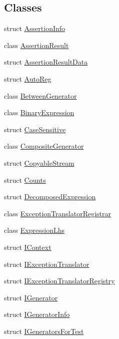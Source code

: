 \subsection*{Classes}
\begin{DoxyCompactItemize}
\item 
struct \mbox{\hyperlink{struct_catch_1_1_assertion_info}{Assertion\+Info}}
\item 
class \mbox{\hyperlink{class_catch_1_1_assertion_result}{Assertion\+Result}}
\item 
struct \mbox{\hyperlink{struct_catch_1_1_assertion_result_data}{Assertion\+Result\+Data}}
\item 
struct \mbox{\hyperlink{struct_catch_1_1_auto_reg}{Auto\+Reg}}
\item 
class \mbox{\hyperlink{class_catch_1_1_between_generator}{Between\+Generator}}
\item 
class \mbox{\hyperlink{class_catch_1_1_binary_expression}{Binary\+Expression}}
\item 
struct \mbox{\hyperlink{struct_catch_1_1_case_sensitive}{Case\+Sensitive}}
\item 
class \mbox{\hyperlink{class_catch_1_1_composite_generator}{Composite\+Generator}}
\item 
struct \mbox{\hyperlink{struct_catch_1_1_copyable_stream}{Copyable\+Stream}}
\item 
struct \mbox{\hyperlink{struct_catch_1_1_counts}{Counts}}
\item 
struct \mbox{\hyperlink{struct_catch_1_1_decomposed_expression}{Decomposed\+Expression}}
\item 
class \mbox{\hyperlink{class_catch_1_1_exception_translator_registrar}{Exception\+Translator\+Registrar}}
\item 
class \mbox{\hyperlink{class_catch_1_1_expression_lhs}{Expression\+Lhs}}
\item 
struct \mbox{\hyperlink{struct_catch_1_1_i_context}{I\+Context}}
\item 
struct \mbox{\hyperlink{struct_catch_1_1_i_exception_translator}{I\+Exception\+Translator}}
\item 
struct \mbox{\hyperlink{struct_catch_1_1_i_exception_translator_registry}{I\+Exception\+Translator\+Registry}}
\item 
struct \mbox{\hyperlink{struct_catch_1_1_i_generator}{I\+Generator}}
\item 
struct \mbox{\hyperlink{struct_catch_1_1_i_generator_info}{I\+Generator\+Info}}
\item 
struct \mbox{\hyperlink{struct_catch_1_1_i_generators_for_test}{I\+Generators\+For\+Test}}

\end{DoxyCompactItemize}
